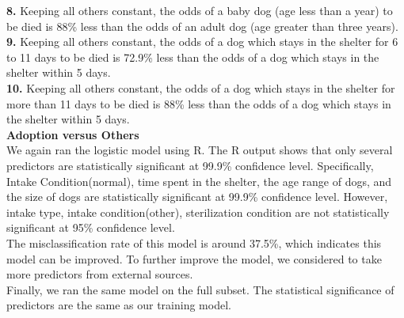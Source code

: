 \documentclass[12pt]{article}
\begin{document}
\begin{flushleft}
\textbf{8.} Keeping all others constant, the odds of a baby dog (age less than a year) to be died is 88\% less than the odds of an adult dog (age greater than three years).\\
 
\textbf{9.} Keeping all others constant, the odds of a dog which stays in the shelter for 6 to 11 days to be died is 72.9\% less than the odds of a dog which stays in the shelter within 5 days.\\
 
\textbf{10.} Keeping all others constant, the odds of a dog which stays in the shelter for more than 11 days to be died is 88\% less than the odds of a dog which stays in the shelter within 5 days.\\
\bigskip
\textbf{Adoption versus Others}\\
We again ran the logistic model using R. The R output shows that only several predictors are statistically significant at 99.9\% confidence level. Specifically, Intake Condition(normal), time spent in the shelter, the age range of dogs, and the size of dogs are statistically significant at 99.9\% confidence level. However, intake type, intake condition(other), sterilization condition are not statistically significant at 95\% confidence level.\\
The misclassification rate of this model is around 37.5\%, which indicates this model can be improved. To further improve the model, we considered to take more predictors from external sources. \\
Finally, we ran the same model on the full subset. The statistical significance of predictors are the same as our training model.\\


\end{flushleft}
\end{document}
